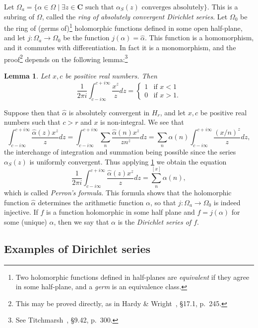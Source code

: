 \documentclass[10pt]{article}
\newtheorem{lemm}[theo]{Lemma}
\theoremstyle{definition}
\def\CC{\mathbf{C}}
\def\fnfi{Two holomorphic functions defined in half-planes are \emph{equivalent} if they agree in some half-plane, and a \emph{germ} is an equivalence class.}
\def\fnsi{This may be proved directly, as in Hardy \& Wright~\cite{bib:86}, \S17.1, p.~245.}
\def\fnse{See Titchmarsh~\cite{bib:194}, \S9.42, p.~300.}
\begin{document}
Let $\Omega_a = \{ \alpha \in \Omega \mid \text{$\exists z \in \CC$ such that $\alpha_S(z)$ converges absolutely} \}$.
This is a subring of $\Omega$, called the \emph{ring of absolutely convergent Dirichlet series}.
Let $\Omega_0$ be the ring of (germs of)\footnote{\fnfi} holomorphic functions defined in some open half-plane, and let $j : \Omega_a \to \Omega_0$ be the function $j(\alpha) = \widehat\alpha$.
This function is a homomorphism, and it commutes with differentiation.
In fact it is a monomorphism, and the proof\footnote{\fnsi} depends on the following lemma:\footnote{\fnse}


\begin{lemm}
\label{1.2.1}
Let $x,c$ be positive real numbers.
Then
\[
\frac{1}{2\pi i} \int_{c - i \infty}^{c + i\infty} \frac{x^z}{z} dz
= \begin{cases}
1 & \text{if $x < 1$}
\\
0 & \text{if $x > 1$}.
\end{cases}
\]
\end{lemm}


Suppose then that $\widehat\alpha$ is absolutely convergent in $H_r$, and let $x,c$ be positive real numbers such that $c > r$ and $x$ is non-integral.
We see that
\[
\int_{c - i\infty}^{c + i\infty} \frac{\widehat\alpha(z) x^z}{z} dz
= \int_{c - i\infty}^{c + i\infty} \sum_n \frac{\widehat\alpha(n) x^z}{z n^z} dz
= \sum_n \alpha(n) \int_{c - i\infty}^{c + i\infty} \frac{(x/n)^z}{z} dz,
\]
the interchange of integration and summation being possible since the series $\alpha_S(z)$ is uniformly convergent.
Thus applying \ref{1.2.1} we obtain the equation
\[
\frac{1}{2\pi i} 
\int_{c-i\infty}^{c+i\infty} \frac{\widehat\alpha(z) x^z}{z} dz
= \sum_n^{[x]} \alpha(n),
\]
which is called \emph{Perron's formula}.
This formula shows that the holomorphic function $\widehat\alpha$ determines the arithmetic function $\alpha$, so that $j : \Omega_a \to \Omega_0$ is indeed injective.
If $f$ is a function holomorphic in some half plane and $f = j(\alpha)$ for some (unique) $\alpha$, then we say that $\alpha$ is the \emph{Dirichlet series of $f$}.


\subsection{Examples of Dirichlet series}
\label{ch:1.3}
\end{document}
